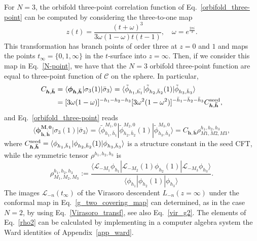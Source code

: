 \documentclass[a4paper,11pt]{article}
\begin{document}
For $N=3$, the orbifold three-point correlation 
function of Eq.~\eqref{orbifold_three-point} can be computed 
by considering the three-to-one map~\cite{Collier}
\begin{equation}\label{g_two_covering_map}
 z(t) =\frac{(t+\omega)^3}{3\omega(1-\omega)t(t-1)},\quad \omega=e^{\frac{2\pi i}{3}}.
\end{equation}
This transformation has branch points of order three at 
$z=0$ and $1$ and maps the points $t_{\infty}=\{0, 1, \infty\}$ in the $t$-surface into $z=\infty$. 
Then, if we consider this map in Eq.~\eqref{N-point}, we have that the $N=3$ orbifold three-point 
function are equal to three-point function of $\mathcal{C}$ on the sphere. In particular,
\begin{align}\label{C_3_0}
 C_{\boldsymbol{h}, \boldsymbol{\bar{h}}}&=
 \langle \boldsymbol{\phi}_{\boldsymbol{h}, \boldsymbol{\bar{h}}}|\sigma_3(1)|\bar{\sigma}_3\rangle
  =\langle \tilde{\phi}_{h_1, \bar{h_1}}|\tilde{\phi}_{h_2, \bar{h}_2}(1)|\tilde{\phi}_{h_3, \bar{h}_3}\rangle \nonumber \\
 &=[3\omega(1-\omega)]^{-h_1-h_2-h_3}[3\omega^2(1-\omega^2)]^{-\bar{h}_1-\bar{h}_2-\bar{h}_3}C_{\boldsymbol{h}, \boldsymbol{\bar{h}}}^{{\rm seed}},
\end{align}
and Eq.~\eqref{orbifold_three-point} reads
\begin{equation}\label{C_3_X}
 \langle \boldsymbol{\phi}^{\boldsymbol{M}, \boldsymbol{0}}_{\boldsymbol{h}, \boldsymbol{\bar{h}}}|\sigma_{3}(1)|\bar{\sigma}_{3}\rangle =\langle \tilde{\phi}_{h_1,\bar{h}_1}^{M_1,0}|\tilde{\phi}_{h_2,\bar{h}_2}^{M_2,0}(1)|\tilde{\phi}_{h_3,\bar{h}_3}^{M_3,0}\rangle
 =C_{\boldsymbol{h}, \boldsymbol{\bar{h}}} \rho_{M1,M2,M3}^{h_1,h_2,h_3},
\end{equation}
where $C_{\boldsymbol{h},\boldsymbol{\bar{h}}}^{{\rm seed}}=\langle \phi_{h_1, \bar{h}_1}|\phi_{h_2,\bar{h}_2}(1)|\phi_{h_3,\bar{h}_3}\rangle$ is a structure constant in the seed CFT, while the symmetric tensor $\rho^{h_1,h_2,h_3}$ is 
\begin{equation}
\label{rho2}
 \rho^{h_1,h_2,h_3}_{M_1,M_2,M_3}:=
 \frac{\langle \mathcal{L}_{-M_1}\phi_{h_1}|\mathcal{L}_{-M_2}(1)\phi_{h_2}(1)|\mathcal{L}_{-M_3}\phi_{h_3}\rangle}
 { \langle \phi_{h_1}|\phi_{h_2}(1)|\phi_{h_3}\rangle}.
\end{equation}
The images $\mathcal{L}_{-n}(t_{\infty})$ of the Virasoro descendent $L_{-n}(z=\infty)$ 
under the conformal map in Eq.~\eqref{g_two_covering_map} can determined, as in the 
case $N=2$, by using Eq.~\eqref{Virasoro_transf}, see also Eq.~\eqref{vir_g2}.
The elements of Eq.~\eqref{rho2} can be calculated by implementing in a computer 
algebra system the Ward identities of Appendix~\ref{app_ward}.
\end{document}
